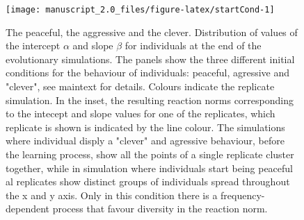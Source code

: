 \documentclass[
  12pt,
]{article}
\providecommand{\DIFaddtex}[1]{{\protect\color{blue}\uwave{#1}}} %
\providecommand{\DIFaddFL}[1]{\DIFadd{#1}} %
\providecommand{\DIFaddbeginFL}{} %
\providecommand{\DIFaddendFL}{} %
\providecommand{\DIFdelbeginFL}{} %
\providecommand{\DIFdelendFL}{} %
\providecommand{\DIFadd}[1]{\texorpdfstring{\DIFaddtex{#1}}{#1}} %
\newcommand{\DIFscaledelfig}{0.5}
\newlength{\DIFdelgraphicswidth} %
\newlength{\DIFdelgraphicsheight} %
\newcommand{\DIFaddincludegraphics}[2][]{{\color{blue}\fbox{\DIFOincludegraphics[#1]{#2}}}} %
\newcommand{\DIFdelincludegraphics}[2][]{%
\sbox{\DIFdelgraphicsbox}{\DIFOincludegraphics[#1]{#2}}%
\settoboxwidth{\DIFdelgraphicswidth}{\DIFdelgraphicsbox} %
\settoboxtotalheight{\DIFdelgraphicsheight}{\DIFdelgraphicsbox} %
\scalebox{\DIFscaledelfig}{%
\parbox[b]{\DIFdelgraphicswidth}{\usebox{\DIFdelgraphicsbox}\\[-\baselineskip] \rule{\DIFdelgraphicswidth}{0em}}\llap{\resizebox{\DIFdelgraphicswidth}{\DIFdelgraphicsheight}{%
\setlength{\unitlength}{\DIFdelgraphicswidth}%
\begin{picture}(1,1)%
\thicklines\linethickness{2pt} %
{\color[rgb]{1,0,0}\put(0,0){\framebox(1,1){}}}%
{\color[rgb]{1,0,0}\put(0,0){\line( 1,1){1}}}%
{\color[rgb]{1,0,0}\put(0,1){\line(1,-1){1}}}%
\end{picture}%
}\hspace*{3pt}}} %
} %
\DeclareRobustCommand{\DIFaddbeginFL}{\DIFOaddbeginFL \let\includegraphics\DIFaddincludegraphics} %
\DeclareRobustCommand{\DIFaddendFL}{\DIFOaddendFL \let\includegraphics\DIFOincludegraphics} %
\DeclareRobustCommand{\DIFdelbeginFL}{\DIFOdelbeginFL \let\includegraphics\DIFdelincludegraphics} %
\DeclareRobustCommand{\DIFdelendFL}{\DIFOaddendFL \let\includegraphics\DIFOincludegraphics} %
\begin{document}
\begin{figure}

{\centering \DIFdelbeginFL %
\DIFdelendFL \DIFaddbeginFL \texttt{[image: manuscript\_2.0\_files/figure-latex/startCond-1]} 

\DIFaddendFL 

}

\caption{The peaceful, the aggressive and the clever. Distribution of values of the \DIFaddbeginFL \DIFaddFL{logistic }\DIFaddendFL intercept $\alpha$ and slope $\beta$ for individuals at the end of the evolutionary simulations. The panels show the three different initial conditions for the behaviour of individuals: peaceful, agressive and  "clever", see maintext for details. Colours indicate the replicate simulation. In the inset, the resulting reaction norms corresponding to the intecept and slope values for one of the replicates, which replicate is shown is indicated by the line colour. The simulations where individual disply a "clever" and agressive behaviour, before the learning process, show all the points of a single replicate cluster together, while in simulation where individuals start being peaceful al replicates show distinct groups of individuals spread throughout the x and y axis. Only in this condition there is a frequency-dependent process that favour diversity in the reaction norm.}\label{fig:startCond}
\end{figure}
\end{document}
